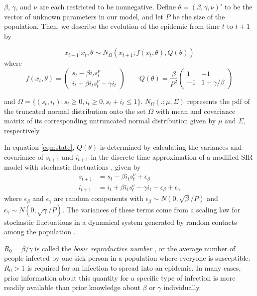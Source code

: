 \documentclass{elsarticle}
\begin{document}
\noindent $\beta$, $\gamma$, and $\nu$ are each restricted to be nonnegative. Define $\theta = (\beta,\gamma,\nu)'$ to be the vector of unknown parameters in our model, and let $P$ be the size of the population. Then, we describe the evolution of the epidemic from time $t$ to $t + 1$ by

\begin{equation}
x_{t+1}\left|x_t,\theta\right. \sim N_\Omega\left(x_{t+1};f(x_t,\theta),Q(\theta)\right) \label{eqn:state}
\end{equation}
\noindent where
\[
f(x_t,\theta) = \left(
\begin{array}{c}
s_t - \beta i_ts^\nu_t \phantom{- \gamma i_t}\,\, \\
i_t +  \beta i_ts^\nu_t - \gamma i_t
\end{array}
\right)
\qquad
Q(\theta) = \frac{\beta}{P^2} \left(
\begin{array}{ccccc}
1 & -1 \\
-1 & 1 + \gamma/\beta
\end{array}
\right)
\]

\noindent and $\Omega = \{(s_t,i_t): s_t \ge 0, i_t \ge 0, s_t + i_t \le 1\}$. $N_{\Omega}(.; \mu,\Sigma)$ represents the pdf of the truncated normal distribution onto the set $\Omega$ with mean and covariance matrix of its corresponding untruncated normal distribution given by $\mu$ and $\Sigma$, respectively.

In equation \eqref{eqn:state}, $Q(\theta)$ is determined by calculating the variances and covariance of $s_{t+1}$ and $i_{t+1}$ in the discrete time approximation of a modified SIR model with stochastic fluctuations \citep{herwaarden1995stochepid, dangerfield2009stochepid, anderson2004sars}, given by
\begin{align*}
s_{t+1} &= s_t - \beta i_ts^\nu_t + \epsilon_\beta \\
i_{t+1} &= i_t + \beta i_ts^\nu_t - \gamma i_t - \epsilon_\beta + \epsilon_\gamma
\end{align*}
where $\epsilon_\beta$ and $\epsilon_\gamma$ are random components with $\epsilon_\beta \sim N(0, \sqrt{\beta} / P)$ and $\epsilon_\gamma \sim N(0, \sqrt{\gamma} / P)$. The variances of these terms come from a scaling law for stochastic fluctuations in a dynamical system generated by random contacts among the population \citep{ovaskainen2010extinction, herwaarden1995stochepid, dangerfield2009stochepid, skvortsov2012monitoring}.

$R_0 = \beta / \gamma$ is called the \emph{basic reproductive number} \citep{heff2005repratio}, or the average number of people infected by one sick person in a population where everyone is susceptible. $R_0 > 1$ is required for an infection to spread into an epidemic. In many cases, prior information about this quantity for a specific type of infection is more readily available than prior knowledge about $\beta$ or $\gamma$ individually. 
\end{document}
